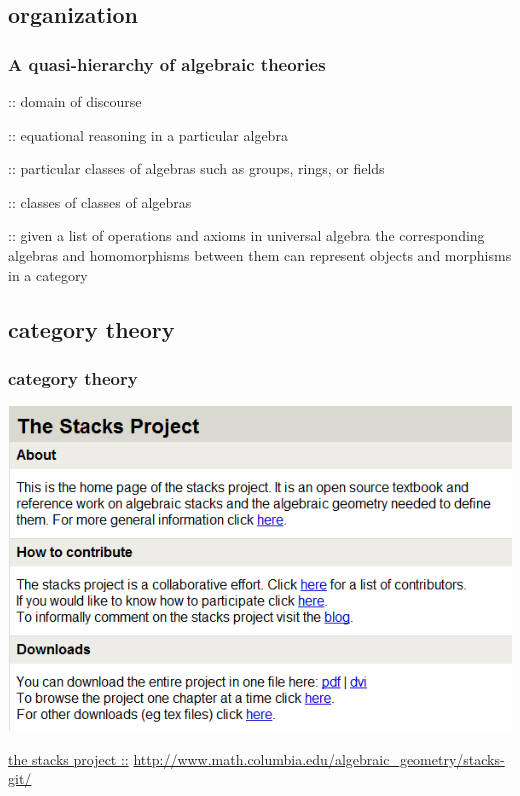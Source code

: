 \subsection{organization}
\begin{frame}
\begin{center}
	\begin{restofframe}
		
	\end{restofframe}
\end{center}
\end{frame}

\begin{frame}
\frametitle{A quasi-hierarchy of algebraic theories}
	\begin{description}
		\pause \item[Theory] :: domain of discourse
		\pause \item[Elementary Algebra] :: equational reasoning in a particular algebra
		\pause \item[Abstract Algebra] :: particular classes of algebras such as groups, rings, or fields
		\pause \item[Universal algebra] :: classes of classes of algebras
		\pause \item[Category theory] :: given a list of operations and axioms in universal algebra the corresponding algebras and homomorphisms between them can represent objects and morphisms in a category
	\end{description}
\end{frame}

\subsection{category theory}

\begin{frame}
\frametitle{category theory}
	\begin{center}
		\includegraphics[scale=0.4]{fig/stacksproject.png}
	\end{center}
	\href{http://www.math.columbia.edu/algebraic_geometry/stacks-git/}{the stacks project ::}
	\url{http://www.math.columbia.edu/algebraic_geometry/stacks-git/}
\end{frame}

